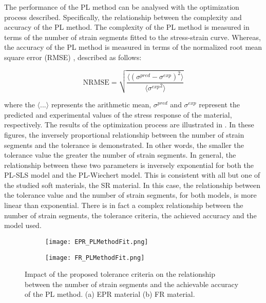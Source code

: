 The performance of the PL method can be analysed with the optimization process described. Specifically, the relationship between the complexity and accuracy of the PL method. The complexity of the PL method is measured in terms of the number of strain segments fitted to the stress-strain curve. Whereas, the accuracy of the PL method is measured in terms of the normalized root mean square error (RMSE) \cite{bergstrom2015mechanics}, described as follows:

\begin{equation}
    \mathrm{NRMSE} = \sqrt{  \frac{\langle (\sigma^{pred} - \sigma^{exp})^2 \rangle}{\langle {\sigma^{exp}}^2 \rangle} }
\label{eq2}
\end{equation}

\noindent where the  $\langle ... \rangle$ represents the arithmetic mean, $\sigma^{pred}$ and $\sigma^{exp}$ represent the predicted and experimental values of the stress response of the material, respectively. The results of the optimization process are illustrated in . In these figures, the inversely proportional relationship between the number of strain segments and the tolerance is demonstrated. In other words, the smaller the tolerance value the greater the number of strain segments. In general, the relationship between these two parameters is inversely exponential for both the PL-SLS model and the PL-Wiechert model. This is consistent with all but one of the studied soft materials, the SR material. In this case, the relationship between the tolerance value and the number of strain segments, for both models, is more linear than exponential. There is in fact a complex relationship between the number of strain segments, the tolerance criteria, the achieved accuracy and the model used.

\newpage

\begin{figure}[H]
	\centering
	\begin{subfigure}[b]{0.9\textwidth}
		\centering
		\texttt{[image: EPR\_PLMethodFit.png]}
		\caption{}
		\label{fig:SegmentsEPR}
	\end{subfigure}
	\begin{subfigure}[b]{0.9\textwidth}
		\centering
		\texttt{[image: FR\_PLMethodFit.png]}
		\caption{}
		\label{fig:SegmentsFR}
	\end{subfigure}
	\caption{Impact of the proposed tolerance criteria on the relationship between the number of strain segments and the achievable accuracy of the PL method. (a) EPR material (b) FR material.}
	\label{fig:SegmentsEPR_FR}
\end{figure}

